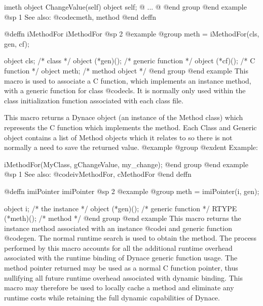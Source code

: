 {{{{imeth object  ChangeValue(self)
object self;
@{
        ...
@}
@end group
@end example
@sp 1
See also:  @code{cmeth, method}
@end deffn













@deffn {iMethodFor} iMethodFor
@sp 2
@example
@group
meth = iMethodFor(cls, gen, cf);

object  cls;            /*  class               */
object  (*gen)();       /*  generic function    */
object  (*cf)();        /*  C function          */
object  meth;           /*  method object       */
@end group
@end example
This macro is used to associate a C function, which implements an
instance method, with a generic function for class @code{cls}.  It is
normally only used within the class initialization function associated
with each class file.

This macro returns a Dynace object (an instance of the Method class) which
represents the C function which implements the method.  Each Class 
and Generic object contains a list of Method objects which it relates
to so there is not normally a need to save the returned value.
@example
@group
@exdent Example:

iMethodFor(MyClass, gChangeValue, my_change);
@end group
@end example
@sp 1
See also:  @code{ivMethodFor, cMethodFor}
@end deffn

















@deffn {imiPointer} imiPointer
@sp 2
@example
@group
meth = imiPointer(i, gen);

object  i;              /*  the instance        */
object  (*gen)();       /*  generic function    */
RTYPE   (*meth)();      /*  method              */
@end group
@end example
This macro returns the instance method associated with an instance 
@code{i} and generic function @code{gen}.  The normal runtime
search is used to obtain the method.  The process performed by this
macro accounts for all the additional runtime overhead associated with
the runtime binding of Dynace generic function usage.  The method pointer
returned may be used as a normal C function pointer, thus nullifying all
future runtime overhead associated with dynamic binding.  This macro may
therefore be used to locally cache a method and eliminate any runtime
costs while retaining the full dynamic capabilities of Dynace.

}}}}
